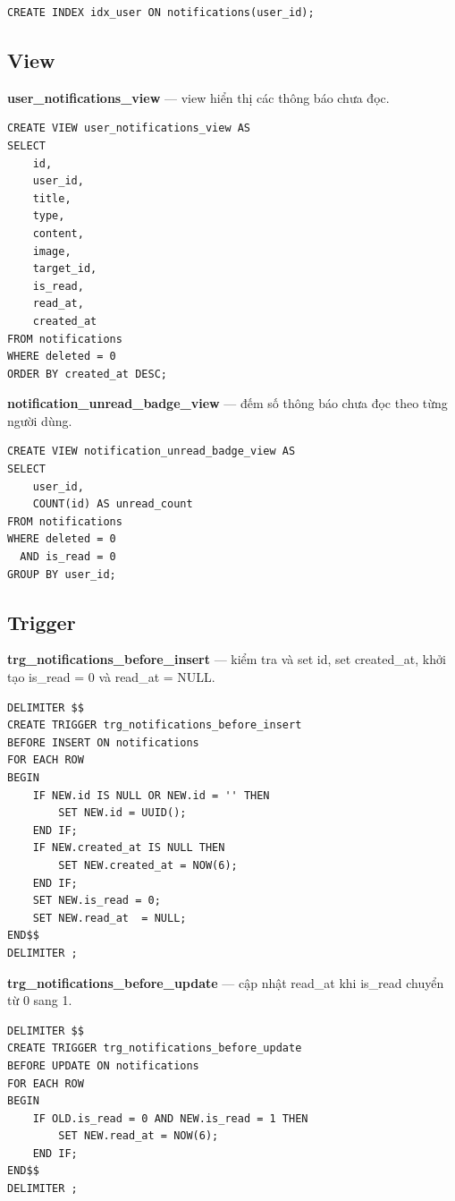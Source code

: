 \begin{verbatim}
CREATE INDEX idx_user ON notifications(user_id);
\end{verbatim}

\subsection{View}

\noindent\textbf{user\_notifications\_view} --- view hiển thị các thông báo chưa đọc.

\begin{verbatim}
CREATE VIEW user_notifications_view AS
SELECT
    id,
    user_id,
    title,
    type,
    content,
    image,
    target_id,
    is_read,
    read_at,
    created_at
FROM notifications
WHERE deleted = 0
ORDER BY created_at DESC;
\end{verbatim}

\noindent\textbf{notification\_unread\_badge\_view} --- đếm số thông báo chưa đọc theo từng người dùng.

\begin{verbatim}
CREATE VIEW notification_unread_badge_view AS
SELECT
    user_id,
    COUNT(id) AS unread_count
FROM notifications
WHERE deleted = 0
  AND is_read = 0
GROUP BY user_id;
\end{verbatim}

\subsection{Trigger}


\noindent\textbf{trg\_notifications\_before\_insert} --- kiểm tra và set id, set created\_at, khởi tạo is\_read = 0 và read\_at = NULL.

\begin{verbatim}
DELIMITER $$
CREATE TRIGGER trg_notifications_before_insert
BEFORE INSERT ON notifications
FOR EACH ROW
BEGIN
    IF NEW.id IS NULL OR NEW.id = '' THEN
        SET NEW.id = UUID();
    END IF;
    IF NEW.created_at IS NULL THEN
        SET NEW.created_at = NOW(6);
    END IF;
    SET NEW.is_read = 0;
    SET NEW.read_at  = NULL;
END$$
DELIMITER ;
\end{verbatim}

\noindent\textbf{trg\_notifications\_before\_update} --- cập nhật read\_at khi is\_read chuyển từ 0 sang 1.

\begin{verbatim}
DELIMITER $$
CREATE TRIGGER trg_notifications_before_update
BEFORE UPDATE ON notifications
FOR EACH ROW
BEGIN
    IF OLD.is_read = 0 AND NEW.is_read = 1 THEN
        SET NEW.read_at = NOW(6);
    END IF;
END$$
DELIMITER ;
\end{verbatim}


